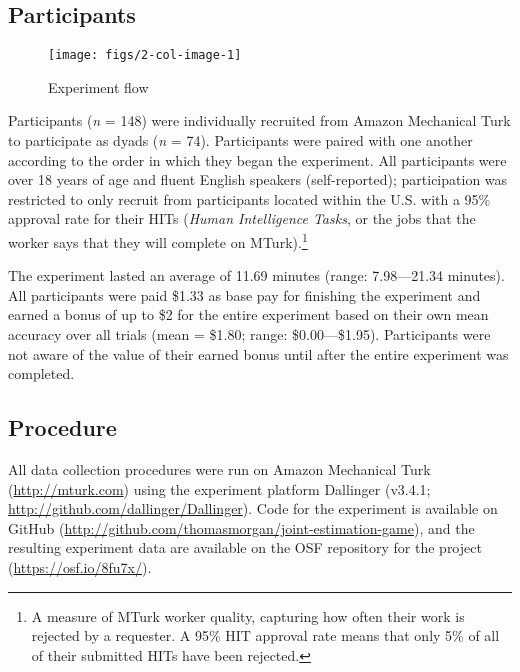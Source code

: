 \documentclass[10pt, letterpaper]{article}
\newenvironment{CodeChunk}{}{}
\begin{document}
\subsection{Participants}\label{participants}

\begin{CodeChunk}
\begin{figure*}[h]

{\centering \texttt{[image: figs/2-col-image-1]} 

}

\caption[Experiment flow]{Experiment flow}\label{fig:2-col-image}
\end{figure*}
\end{CodeChunk}

Participants (\emph{n} = 148) were individually recruited from Amazon
Mechanical Turk to participate as dyads (\emph{n} = 74). Participants
were paired with one another according to the order in which they began
the experiment. All participants were over 18 years of age and fluent
English speakers (self-reported); participation was restricted to only
recruit from participants located within the U.S. with a 95\% approval
rate for their HITs (\emph{Human Intelligence Tasks}, or the jobs that
the worker says that they will complete on
MTurk).\footnote{A measure of MTurk worker quality, capturing how often their work is rejected by a requester. A 95\% HIT approval rate means that only 5\% of all of their submitted HITs have been rejected.}

The experiment lasted an average of 11.69 minutes (range: 7.98---21.34
minutes). All participants were paid \$1.33 as base pay for finishing
the experiment and earned a bonus of up to \$2 for the entire experiment
based on their own mean accuracy over all trials (mean = \$1.80; range:
\$0.00---\$1.95). Participants were not aware of the value of their
earned bonus until after the entire experiment was completed.

\subsection{Procedure}\label{procedure}

All data collection procedures were run on Amazon Mechanical Turk
(\url{http://mturk.com}) using the experiment platform Dallinger
(v3.4.1; \url{http://github.com/dallinger/Dallinger}). Code for the
experiment is available on GitHub
(\url{http://github.com/thomasmorgan/joint-estimation-game}), and the
resulting experiment data are available on the OSF repository for the
project (\url{https://osf.io/8fu7x/}).
\end{document}
